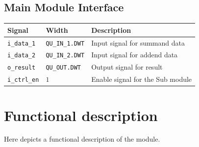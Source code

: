 \documentclass[a4paper, oneside]{report}
\begin{document}
            \subsection{Main Module Interface}
                \begin{longtable}{lll}
                    \toprule
                    \textbf{Signal}      & \textbf{Width}    & \textbf{Description} \\
                    \midrule
                    \texttt{i\_data\_1}      & \texttt{QU\_IN\_1.DWT}         & Input signal for summand data \\
                    \texttt{i\_data\_2}      & \texttt{QU\_IN\_2.DWT}        & Input signal for addend data \\
                    \texttt{o\_result}    & \texttt{QU\_OUT.DWT}         & Output signal for result \\
                    \texttt{i\_ctrl\_en}     & $1$                 & Enable signal for the Sub module\\
                    \bottomrule
                \end{longtable}
        
        \section{Functional description}
        Here depicts a functional description of the module.
\end{document}
